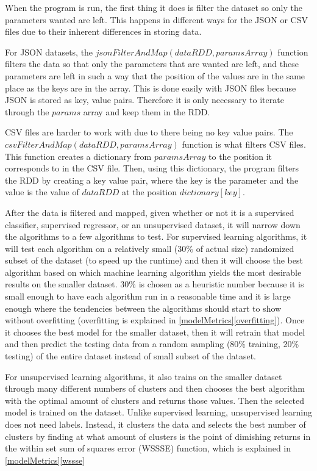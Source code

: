\documentclass[9pt,twocolumn,twoside]{idsi}
\begin{document}
When the program is run, the first thing it does is filter the dataset so only the parameters wanted are left. This happens in different ways for the JSON or CSV files due to their inherent differences in storing data.

For JSON datasets, the $jsonFilterAndMap(dataRDD, paramsArray)$ function filters the data so that only the parameters that are wanted are left, and these parameters are left in such a way that the position of the values are in the same place as the keys are in the array. This is done easily with JSON files because JSON is stored as key, value pairs. Therefore it is only necessary to iterate through the $params$ array and keep them in the RDD.


CSV files are harder to work with due to there being no key value pairs. The $csvFilterAndMap(dataRDD, paramsArray)$ function is what filters CSV files. This function creates a dictionary from $paramsArray$ to the position it corresponds to in the CSV file. Then, using this dictionary, the program filters the RDD by creating a key value pair, where the key is the parameter and the value is the value of $dataRDD$ at the position $dictionary[key]$.

After the data is filtered and mapped, given whether or not it is a supervised classifier, supervised regressor, or an unsupervised dataset, it will narrow down the algorithms to a few algorithms to test. For supervised learning algorithms, it will test each algorithm on a relatively small (30\% of actual size) randomized subset of the dataset (to speed up the runtime) and then it will choose the best algorithm  based on which machine learning algorithm  yields the most desirable results on the smaller dataset. 30\% is chosen as a heuristic number because it is small enough to have each algorithm run in a reasonable time and it is large enough where the tendencies between the algorithms should start to show without overfitting (overfitting is explained in \ref{modelMetrics}\ref{overfitting}). Once it chooses the best model for the smaller dataset, then it will retrain that model and then predict the testing data from a random sampling (80\% training, 20\% testing) of the entire dataset instead of small subset of the dataset.

For unsupervised learning algorithms, it also trains on the smaller dataset through many different numbers of clusters and then chooses the best algorithm with the optimal amount of clusters and returns those values. Then the selected model is trained on the dataset. Unlike supervised learning, unsupervised learning does not need labels. Instead, it clusters the data and selects the best number of clusters by finding at what amount of clusters is the point of dimishing returns in the within set sum of squares error (WSSSE) function, which is explained in \ref{modelMetrics}\ref{wssse}
\end{document}
